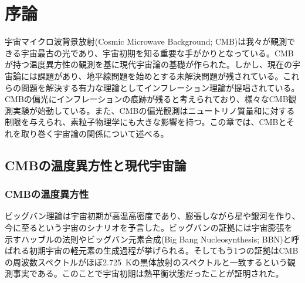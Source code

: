\chapter{序論}
\label{chapter1}
宇宙マイクロ波背景放射(Cosmic Microwave Background; CMB)は我々が観測できる宇宙最古の光であり、宇宙初期を知る重要な手がかりとなっている。CMBが持つ温度異方性の観測を基に現代宇宙論の基礎が作られた。しかし、現在の宇宙論には課題があり、地平線問題を始めとする未解決問題が残されている。これらの問題を解決する有力な理論としてインフレーション理論が提唱されている。CMBの偏光にインフレーションの痕跡が残ると考えられており、様々なCMB観測実験が始動している。また、CMBの偏光観測はニュートリノ質量和に対する制限を与えられ、素粒子物理学にも大きな影響を持つ。この章では、CMBとそれを取り巻く宇宙論の関係について述べる。

\section{CMBの温度異方性と現代宇宙論}


\subsection{CMBの温度異方性}
ビッグバン理論は宇宙初期が高温高密度であり、膨張しながら星や銀河を作り、今に至るという宇宙のシナリオを予言した。ビッグバンの証拠には宇宙膨張を示すハッブルの法則やビッグバン元素合成(Big Bang Nucleosynthesis; BBN\cite{BBN})と呼ばれる初期宇宙の軽元素の生成過程が挙げられる。そしてもう1つの証拠はCMBの周波数スペクトルがほぼ\SI{2.725}{K}の黒体放射のスペクトルと一致するという観測事実\cite{2725}である。このことで宇宙初期は熱平衡状態だったことが証明された。

